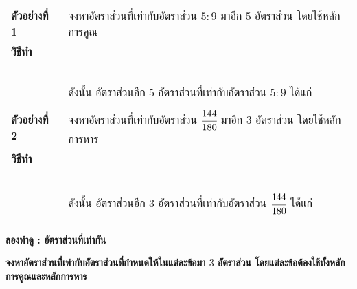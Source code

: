 \documentclass[
  a4paper,
  DIV=11,
  numbers=noendperiod]{scrartcl}
\begin{document}
\begin{longtable*}[l]{lp{13cm}}

\textbf{ตัวอย่างที่ 1} & จงหาอัตราส่วนที่เท่ากับอัตราส่วน $5:9$ มาอีก $5$ อัตราส่วน โดยใช้หลักการคูณ \\
\textbf{วิธีทำ}     &   \dotfill        \\
                  &   \dotfill  \\   
                  &   \dotfill  \\      
                  &   \dotfill  \\      
                  &   \dotfill  \\      
                  &   \dotfill  \\ 
                  &   ดังนั้น อัตราส่วนอีก $5$ อัตราส่วนที่เท่ากับอัตราส่วน $5:9$ ได้แก่ \\  
                  &   \dotfill  \\   

\newpage

\textbf{ตัวอย่างที่ 2} & จงหาอัตราส่วนที่เท่ากับอัตราส่วน $\cfrac{144}{180}$ มาอีก $3$ อัตราส่วน โดยใช้หลักการหาร \\
\textbf{วิธีทำ}     &   \dotfill        \\
                  &   \dotfill  \\   
                  &   \dotfill  \\      
                  &   \dotfill  \\      
                  &   \dotfill  \\      
                  &   \dotfill  \\ 
                  &   ดังนั้น อัตราส่วนอีก $3$ อัตราส่วนที่เท่ากับอัตราส่วน $\cfrac{144}{180}$ ได้แก่ \\  
                  &   \dotfill  \\  
                              
\end{longtable*}

\centering

\begin{tcolorbox}[colback=white!5!white,
colframe=red!70!black,width=7cm]
\centering \textbf{ลองทำดู : อัตราส่วนที่เท่ากัน}
\end{tcolorbox}

\flushleft

\textbf{จงหาอัตราส่วนที่เท่ากับอัตราส่วนที่กำหนดให้ในแต่ละข้อมา $3$ อัตราส่วน โดยแต่ละข้อต้องใช้ทั้งหลักการคูณและหลักการหาร}
\end{document}
